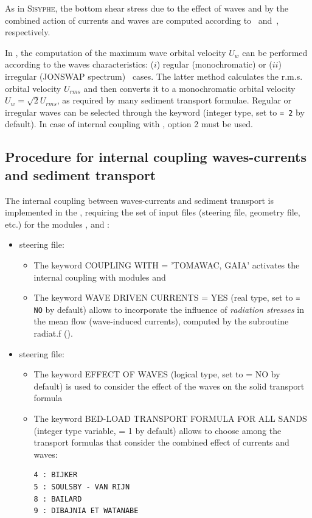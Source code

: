 As in \textsc{Sisyphe}, the bottom shear stress due to the effect of waves and by the combined action of currents and waves are computed according to~\cite{Swart1976} and~\cite{soulsby1997dynamics}, respectively.

In \gaia, the computation of the maximum wave orbital velocity $U_w$ can be performed according to the waves characteristics: ($i$) regular (monochromatic) or ($ii$) irregular (JONSWAP spectrum)~\cite{soulsby1986direct} cases. The latter method calculates the r.m.s. orbital velocity $U_{rms}$ and then converts it to a monochromatic orbital velocity $U_w = \sqrt{2}U_{rms}$, as required by many sediment transport formulae.
Regular or irregular waves can be selected through the keyword  (integer type, set to \texttt{= 2} by default). In case of internal
coupling with \tomawac, option 2 must be used.


\subsection{Procedure for internal coupling waves-currents and sediment transport}
The internal coupling between waves-currents and sediment transport is implemented in the \telemacsystem{}, requiring the set of input files (steering file, geometry file, etc.) for the modules , \tomawac{} and \gaia{}:
\begin{itemize}
  \item {} steering file:
\begin{itemize}
\item The keyword {\ttfamily COUPLING WITH = 'TOMAWAC, GAIA'} activates the internal coupling with modules \tomawac{} and \gaia{}
\item The keyword {\ttfamily WAVE DRIVEN CURRENTS = YES} (real type, set to \texttt{= NO} by default) allows to incorporate the influence of \textit{radiation stresses} in the mean flow (wave-induced currents), computed by the subroutine {\ttfamily radiat.f} (\tomawac{}).
\end{itemize}

 \item \gaia{} steering file:
\begin{itemize}
\item The keyword {\ttfamily EFFECT OF WAVES} (logical type, set to {\ttfamily = NO} by default) is used to consider the effect of the waves on the solid transport formula
\item The keyword {\ttfamily BED-LOAD TRANSPORT FORMULA FOR ALL SANDS} (integer type variable, {\ttfamily = 1} by default) allows to choose among the transport formulas that consider the combined effect of currents and waves:
\begin{lstlisting}[frame=trBL]
4 : BIJKER
5 : SOULSBY - VAN RIJN
8 : BAILARD
9 : DIBAJNIA ET WATANABE
\end{lstlisting}
\end{itemize}
\end{itemize}


